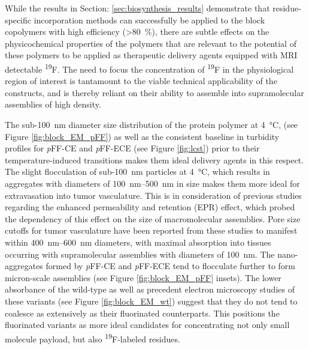 \begin{refsection}
While the results in Section: \ref{sec:biosynthesis_results} demonstrate that
residue-specific incorporation methods can successfully be applied to the block
copolymers with high efficiency (\textgreater \SI{80}{\percent}), there are
subtle effects on the physicochemical properties of the polymers that are
relevant to the potential of these polymers to be applied as therapeutic
delivery agents equipped with MRI detectable \textsuperscript{19}F. The need to
focus the concentration of \textsuperscript{19}F in the physiological region of
interest is tantamount to the viable technical applicability of the constructs,
and is thereby reliant on their ability to assemble into supramolecular assemblies of
high density.

The sub-\SI{100}{\nm} diameter size distribution of the protein polymer at
\SI{4}{\celsius}, (see Figure \ref{fig:block_EM_pFF}) as well as the consistent
baseline in turbidity profiles for \emph{p}FF-CE and \emph{p}FF-ECE (see Figure
\ref{fig:lcst}) prior to their temperature-induced transitions makes them ideal
delivery agents in this respect. The slight flocculation of sub-\SI{100}{\nm}
particles at \SI{4}{\celsius}, which results in aggregates with diameters of
\SIrange{100}{500}{\nm} in size makes them more ideal for extravasation into
tumor vasculature. This is in consideration of previous studies regarding the
enhanced permeability and retention (EPR) effect, which probed the dependency of
this effect on the size of macromolecular assemblies. Pore size cutoffs for
tumor vasculature have been reported from these studies to manifest within
\SIrange{400}{600}{\nm} diameters,\cite{Yuan1995} with maximal absorption into
tissues occurring with supramolecular assemblies with diameters of
\SI{100}{\nm}.\cite{Charrois2003} The nano-aggregates formed by \emph{p}FF-CE
and \emph{p}FF-ECE tend to flocculate further to form micron-scale assemblies
(see Figure \ref{fig:block_EM_pFF} insets). The lower absorbance of the
wild-type as well as precedent electron microscopy studies of these variants
(see Figure \ref{fig:block_EM_wt}) suggest that they do not tend to coalesce as
extensively as their fluorinated counterparts. This positions the fluorinated
variants as more ideal candidates for concentrating not only small molecule
payload, but also \textsuperscript{19}F-labeled residues.


\end{refsection}
